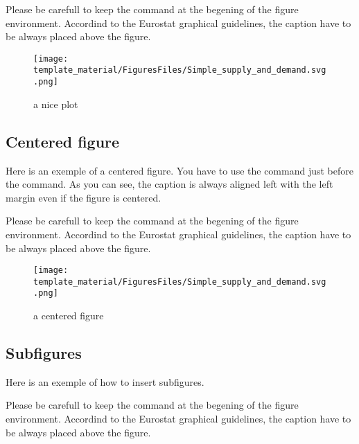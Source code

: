 \documentclass[Theme1]{{template_material/eurostat}}
\begin{document}
Please be carefull to keep the  command at the begening of the figure environment. Accordind to the Eurostat graphical guidelines, the caption have to be always placed above the figure.

\begin{figure}[h]
    \caption{a nice plot} %
    \label{fig:figure1}
    \texttt{[image: template\_material/FiguresFiles/Simple\_supply\_and\_demand.svg.png]}
\end{figure}

\newpage
\subsection{Centered figure}

Here is an exemple of a centered figure. You have to use the  command just before the  command. As you can see, the caption is always aligned left with the left margin even if the figure is centered. 

Please be carefull to keep the  command at the begening of the figure environment. Accordind to the Eurostat graphical guidelines, the caption have to be always placed above the figure.

\begin{figure}[h]
    \caption{a centered figure} %
    \label{fig:figure2}
    \centering
    \texttt{[image: template\_material/FiguresFiles/Simple\_supply\_and\_demand.svg.png]}
\end{figure}

\newpage
\subsection{Subfigures}

Here is an exemple of how to insert subfigures. 

Please be carefull to keep the  command at the begening of the figure environment. Accordind to the Eurostat graphical guidelines, the caption have to be always placed above the figure.
\end{document}
